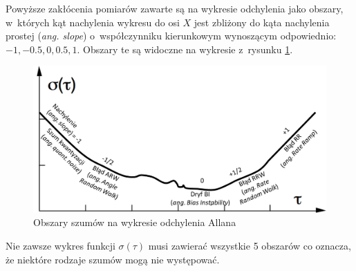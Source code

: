 Powyższe zakłócenia pomiarów zawarte są na wykresie odchylenia jako obszary, w~których kąt nachylenia wykresu do osi $X$ jest zbliżony do kąta nachylenia prostej (\emph{ang. slope}) o~współczynniku kierunkowym wynoszącym odpowiednio: $-1, -0.5, 0, 0.5 , 1$. Obszary te są widoczne na wykresie z~rysunku \ref{fig:appx:allan:slopes}.

\begin{savenotes}
	\begin{figure}[!htb]
		\centering
		\includegraphics[width=\linewidth]{images/slopes.png}
		\caption[Obszary szumów na wykresie odchylenia Allana]{Obszary szumów na wykresie odchylenia Allana \cite{s120202219}}
		\label{fig:appx:allan:slopes}
	\end{figure}
\end{savenotes}
				
Nie zawsze wykres funkcji $\sigma(\tau)$ musi zawierać wszystkie 5 obszarów co oznacza, że niektóre rodzaje szumów mogą nie występować.